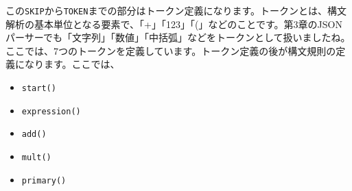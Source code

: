 \begin{Shaded}
\begin{Highlighting}[]
  \NormalTok{() :}
\NormalTok{\{}\NormalTok{; }\NormalTok{;\}}
\NormalTok{\{}
\NormalTok{    \}}
\NormalTok{\}}


  \NormalTok{() :}
\NormalTok{\{}\NormalTok{; }\NormalTok{;\}}
\NormalTok{\{}
\NormalTok{() ( }
\NormalTok{\}}

  \NormalTok{() :}
\NormalTok{\{}\NormalTok{;\}}
\NormalTok{\{}
\NormalTok{(}
\NormalTok{); \}}
\NormalTok{) \{ }
\NormalTok{\}}
\end{Highlighting}
\end{Shaded}

この\texttt{SKIP}から\texttt{TOKEN}までの部分はトークン定義になります。トークンとは、構文解析の基本単位となる要素で、「+」「123」「(」などのことです。第3章のJSONパーサーでも「文字列」「数値」「中括弧」などをトークンとして扱いましたね。ここでは、7つのトークンを定義しています。トークン定義の後が構文規則の定義になります。ここでは、

\begin{itemize}
\tightlist
\item
  \texttt{start()}
\item
  \texttt{expression()}
\item
  \texttt{add()}
\item
  \texttt{mult()}
\item
  \texttt{primary()}
\end{itemize}

